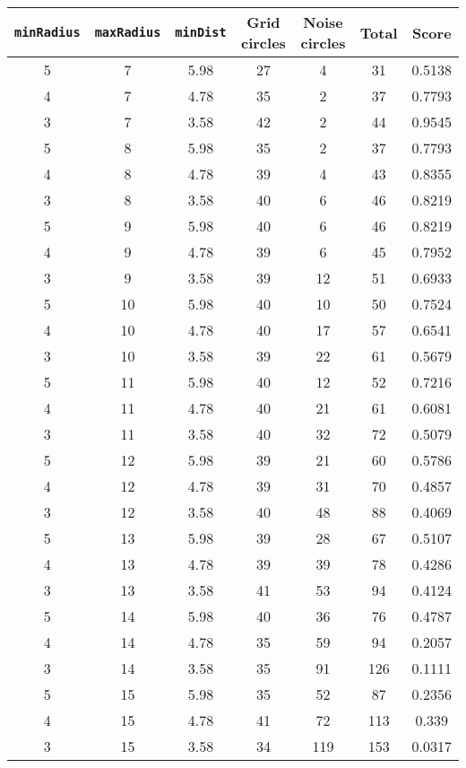 \documentclass[letterpaper, 12pt]{article}
\begin{document}
\begin{longtable}{|c|c|c|c|c|c|c|}
\hline
\textbf{\texttt{minRadius}} & \textbf{\texttt{maxRadius}} & \textbf{\texttt{minDist}} & \textbf{Grid circles} & \textbf{Noise circles} & \textbf{Total} & \textbf{Score} \\
\hline
5 & 7 & 5.98 & 27 & 4 & 31 & 0.5138 \\
\hline
4 & 7 & 4.78 & 35 & 2 & 37 & 0.7793 \\
\hline
3 & 7 & 3.58 & 42 & 2 & 44 & 0.9545 \\
\hline
5 & 8 & 5.98 & 35 & 2 & 37 & 0.7793 \\
\hline
4 & 8 & 4.78 & 39 & 4 & 43 & 0.8355 \\
\hline
3 & 8 & 3.58 & 40 & 6 & 46 & 0.8219 \\
\hline
5 & 9 & 5.98 & 40 & 6 & 46 & 0.8219 \\
\hline
4 & 9 & 4.78 & 39 & 6 & 45 & 0.7952 \\
\hline
3 & 9 & 3.58 & 39 & 12 & 51 & 0.6933 \\
\hline
5 & 10 & 5.98 & 40 & 10 & 50 & 0.7524 \\
\hline
4 & 10 & 4.78 & 40 & 17 & 57 & 0.6541 \\
\hline
3 & 10 & 3.58 & 39 & 22 & 61 & 0.5679 \\
\hline
5 & 11 & 5.98 & 40 & 12 & 52 & 0.7216 \\
\hline
4 & 11 & 4.78 & 40 & 21 & 61 & 0.6081 \\
\hline
3 & 11 & 3.58 & 40 & 32 & 72 & 0.5079 \\
\hline
5 & 12 & 5.98 & 39 & 21 & 60 & 0.5786 \\
\hline
4 & 12 & 4.78 & 39 & 31 & 70 & 0.4857 \\
\hline
3 & 12 & 3.58 & 40 & 48 & 88 & 0.4069 \\
\hline
5 & 13 & 5.98 & 39 & 28 & 67 & 0.5107 \\
\hline
4 & 13 & 4.78 & 39 & 39 & 78 & 0.4286 \\
\hline
3 & 13 & 3.58 & 41 & 53 & 94 & 0.4124 \\
\hline
5 & 14 & 5.98 & 40 & 36 & 76 & 0.4787 \\
\hline
4 & 14 & 4.78 & 35 & 59 & 94 & 0.2057 \\
\hline
3 & 14 & 3.58 & 35 & 91 & 126 & 0.1111 \\
\hline
5 & 15 & 5.98 & 35 & 52 & 87 & 0.2356 \\
\hline
4 & 15 & 4.78 & 41 & 72 & 113 & 0.339 \\
\hline
3 & 15 & 3.58 & 34 & 119 & 153 & 0.0317 \\

\end{longtable}
\end{document}

